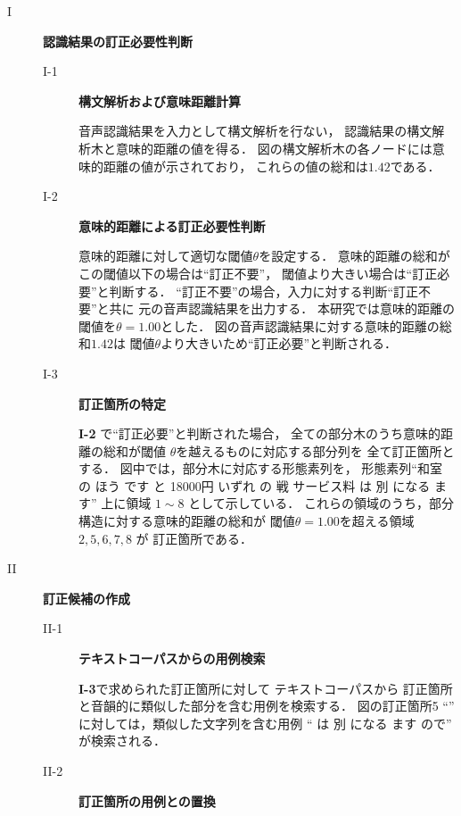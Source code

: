 \begin{description}
\item[I] {\bf 認識結果の訂正必要性判断}
  \begin{description}
    \item[I-1] {\bf 構文解析および意味距離計算}

音声認識結果を入力として構文解析\cite{Furuse1999}を行ない，
認識結果の構文解析木と意味的距離の値を得る．
図の構文解析木の各ノードには意味的距離の値が示されており，
これらの値の総和は$1.42$である．

    \item[I-2] {\bf 意味的距離による訂正必要性判断}

意味的距離に対して適切な閾値$\theta$を設定する．
意味的距離の総和がこの閾値以下の場合は``訂正不要''，
閾値より大きい場合は``訂正必要''と判断する．
``訂正不要''の場合，入力に対する判断``訂正不要''と共に
元の音声認識結果を出力する．
本研究では意味的距離の閾値を$\theta = 1.00$とした．
図の音声認識結果に対する意味的距離の総和$1.42$は
閾値$\theta$より大きいため``訂正必要''と判断される．

    \item[I-3] {\bf 訂正箇所の特定}

{\bf I-2} で``訂正必要''と判断された場合，
全ての部分木のうち意味的距離の総和が閾値
$\theta$を越えるものに対応する部分列を
全て訂正箇所とする．
図中では，部分木に対応する形態素列を，
形態素列``和室 の ほう です と 18000円
 いずれ の 戦 サービス料 は 別 になる ます''
上に領域 $1 \sim 8$ として示している．
これらの領域のうち，部分構造に対する意味的距離の総和が
閾値$\theta = 1.00$を超える領域 $2, 5, 6, 7, 8$ が
訂正箇所である．

  \end{description}

\item[II] {\bf 訂正候補の作成}

  \begin{description}

    \item[II-1] {\bf テキストコーパスからの用例検索}

{\bf I-3}で求められた訂正箇所に対して
テキストコーパスから
訂正箇所と音韻的に類似した部分を含む用例を検索する．
図の訂正箇所5 ``''
に対しては，類似した文字列を含む用例
`` は 別 になる ます ので''
が検索される．

        \item[II-2] {\bf 訂正箇所の用例との置換}


\end{description}
\end{description}

